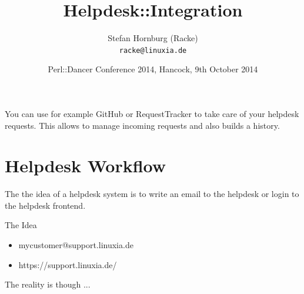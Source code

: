 \usepackage[utf8]{inputenc}
\usepackage[T1]{fontenc}
\usepackage{mathptmx}
\usepackage[scaled=.90]{helvet}
\usepackage{courier}
\usepackage{caption}
\captionsetup{labelformat=empty,labelsep=none}
\usepackage{verbatim}
\usepackage{hyperref}
\usepackage{listings}
\usepackage{ulem}
\lstset{language=Perl,basicstyle=\normalsize,tabsize=3,showstringspaces=false}

\title{Helpdesk::Integration}
\author[racke]{Stefan Hornburg (Racke)\\ \texttt{racke@linuxia.de}}
\date{Perl::Dancer Conference 2014, Hancock, 9th October 2014}



\maketitle{}

\begin{frame}
  \titlepage
\end{frame}

\tableofcontents

You can use for example GitHub or RequestTracker to take care of your
helpdesk requests. This allows to manage incoming requests and also builds
a history.

\section{Helpdesk Workflow}

The the idea of a helpdesk system is to write an email to the helpdesk
or login to the helpdesk frontend.

\begin{frame}[fragile]{The Idea}
\begin{itemize}
\item mycustomer@support.linuxia.de
\item https://support.linuxia.de/
\end{itemize}
\end{frame}

The reality is though ...


